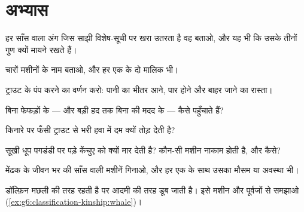 \section{अभ्यास}

\begin{exercise}[$\star$]\label{exo:g7:how-animals-breathe:1}
हर साँस वाला अंग जिस साझी विशेष-सूची पर खरा उतरता है वह बताओ, और यह भी
कि उसके तीनों गुण क्यों मायने रखते हैं।
\end{exercise}

\begin{exercise}[$\star$]\label{exo:g7:how-animals-breathe:2}
चारों मशीनों के नाम बताओ, और हर एक के दो मालिक भी।
\end{exercise}

\begin{exercise}[$\star$]\label{exo:g7:how-animals-breathe:3}
ट्राउट के पंप करने का वर्णन करो: पानी का भीतर आने, पार होने और बाहर
जाने का रास्ता।
\end{exercise}

\begin{exercise}[$\star$]\label{exo:g7:how-animals-breathe:4}
 बिना फेफड़ों के --- और बड़ी हद तक बिना  की मदद के --- 
कैसे पहुँचाते हैं?
\end{exercise}

\begin{exercise}[$\star$]\label{exo:g7:how-animals-breathe:5}
किनारे पर फँसी ट्राउट  से भरी हवा में दम क्यों तोड़ देती है?
\end{exercise}

\begin{exercise}[$\star$]\label{exo:g7:how-animals-breathe:6}
सूखी धूप पगडंडी पर पड़े केंचुए को क्यों मार देती है? कौन-सी मशीन
नाकाम होती है, और कैसे?
\end{exercise}

\begin{exercise}[$\star\star$]\label{exo:g7:how-animals-breathe:7}
मेंढक के जीवन भर की साँस वाली मशीनें गिनाओ, और हर एक के साथ उसका मौसम या
अवस्था भी।
\end{exercise}

\begin{exercise}[$\star\star$]\label{exo:g7:how-animals-breathe:8}
डॉल्फ़िन मछली की तरह रहती है पर आदमी की तरह डूब जाती है। इसे मशीन और
पूर्वजों से समझाओ (\cref{ex:g6:classification-kinship:whale})।
\end{exercise}

